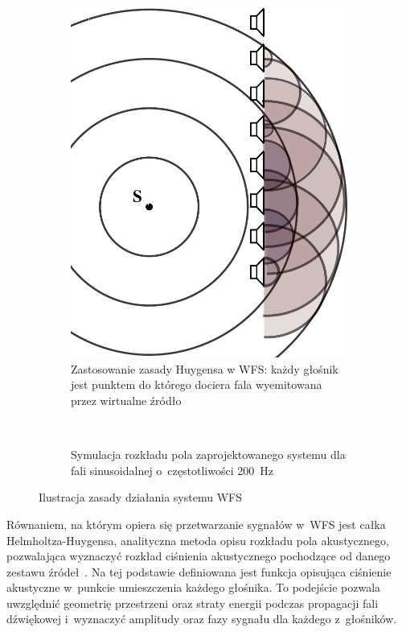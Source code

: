 \documentclass[10pt, a4paper]{article}
\begin{document}
\begin{figure}[!tbh]
  \centering
  \begin{subfigure}[b]{.49\textwidth}
  \centering
  \includegraphics[scale=.35]{vecgraphics/WFS_idea.pdf}
  \caption{Zastosowanie zasady Huygensa w WFS: każdy głośnik jest punktem do
  którego dociera fala wyemitowana przez wirtualne źródło}
  \label{r:Huygens}
  \end{subfigure}
  ~
  \begin{subfigure}[b]{.49\textwidth}
  \centering
  \caption{Symulacja rozkładu pola zaprojektowanego systemu dla fali sinusoidalnej o~częstotliwości \SI{200}{\hertz}}
  \label{r:symulacja}
  \end{subfigure}
  \caption{Ilustracja zasady działania systemu WFS}
\end{figure}

Równaniem, na którym opiera się przetwarzanie sygnałów w~WFS jest całka
Helmholtza-Huygensa, analityczna metoda opisu rozkładu pola akustycznego,
pozwalająca wyznaczyć rozkład ciśnienia akustycznego pochodzące od danego
zestawu źródeł~\cite{snaka}. Na tej podstawie definiowana jest funkcja
opisująca ciśnienie akustyczne w~punkcie umieszczenia każdego głośnika. To
podejście pozwala uwzględnić geometrię przestrzeni oraz straty energii podczas
propagacji fali dźwiękowej i~wyznaczyć amplitudy oraz fazy sygnału dla każdego
z~głośników. 
\end{document}
